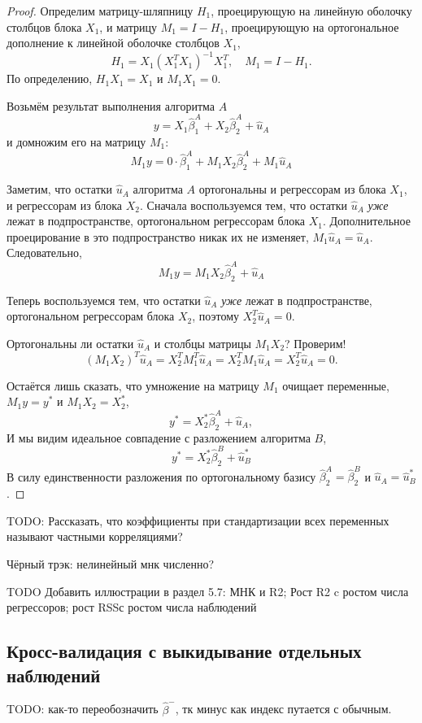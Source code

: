 \documentclass[12pt]{article}
\newcommand{\hb}{\hat{\beta}}
\newcommand{\hu}{\hat{u}}
\newcommand{\RSS}{RSS}
\begin{document}
\begin{proof}
Определим матрицу-шляпницу $H_1$, проецирующую на линейную оболочку столбцов блока $X_1$, и матрицу $M_1 = I - H_1$, проецирующую на ортогональное дополнение к линейной оболочке столбцов $X_1$,
\[
H_1 = X_1(X_1^TX_1)^{-1}X_1^T, \quad M_1 = I - H_1.
\]
По определению, $H_1 X_1 = X_1$ и $M_1 X_1 = 0$.

Возьмём результат выполнения алгоритма $A$
\[
y = X_1 \hb_1^A + X_2 \hb_2^A + \hu_A
\]
и домножим его на матрицу $M_1$:
\[
M_1 y = 0 \cdot \hb_1^A + M_1 X_2 \hb_2^A + M_1 \hu_A
\]

Заметим, что остатки $\hu_A$ алгоритма $A$ ортогональны и регрессорам из блока $X_1$, и регрессорам из блока $X_2$. 
Сначала воспользуемся тем, что остатки $\hu_A$ \emph{уже} лежат в подпространстве, ортогональном регрессорам блока $X_1$. 
Дополнительное проецирование в это подпространство никак их не изменяет, $M_1 \hu_A  = \hu_A$.
Следовательно,
\[
M_1 y  = M_1 X_2 \hb_2^A + \hu_A
\]

Теперь воспользуемся тем, что остатки $\hu_A$ \emph{уже} лежат в подпространстве, ортогональном регрессорам блока $X_2$, поэтому $X_2^T \hu_A = 0$.

Ортогональны ли остатки $\hu_A$ и столбцы матрицы $M_1 X_2$? Проверим!
\[
(M_1 X_2)^T \hu_A = X_2^T M_1^T \hu_A = X_2^T M_1 \hu_A = X_2^T \hu_A = 0.
\]

Остаётся лишь сказать, что умножение на матрицу $M_1$ очищает переменные, $M_1 y = y^*$ и $M_1 X_2 = X_2^*$,
\[
y^* = X_2^* \hb_2^A + \hu_A,
\]
И мы видим идеальное совпадение с разложением алгоритма $B$,
\[
y^* = X_2^* \hb_2^B + \hu^*_B
\]
В силу единственности разложения по ортогональному базису $\hb_2^A = \hb_2^B$ и $\hu_A = \hu^*_B$.
\end{proof}


TODO: Рассказать, что коэффициенты при стандартизации всех переменных называют частными корреляциями?

Чёрный трэк: нелинейный мнк численно?

TODO Добавить иллюстрации в раздел 5.7: МНК и R2; Рост R2 c ростом числа регрессоров; рост \RSS с ростом числа наблюдений

\subsection{Кросс-валидация с выкидывание отдельных наблюдений}

TODO: как-то переобозначить $\hb^-$, тк минус как индекс путается с обычным. 
\end{document}

